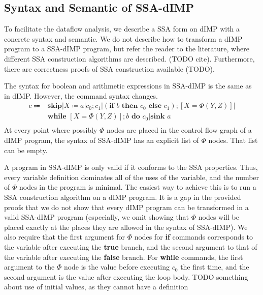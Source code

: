 \subsection{Syntax and Semantic of SSA-dIMP}
To facilitate the dataflow analysis, we describe a SSA form on dIMP with a concrete
syntax and semantic.
We do not describe how to transform a dIMP program to a SSA-dIMP program, but 
refer the reader to the literature, where different SSA construction algorithms are
described. (TODO cite). Furthermore, there are correctness proofs of SSA construction
available (TODO).

The syntax for boolean and arithmetic expressions in SSA-dIMP is the same as in dIMP.
However, the command syntax changes.
\begin{align*}
    c \Coloneqq &\textbf{skip} | X \coloneqq a| c_0; c_1 | (\textbf{if } b \textbf{ then }c_0
    \textbf{ else }c_1);[X = \Phi(Y, Z)] |\\
    &\textbf{while }[X = \Phi(Y, Z)]; b\textbf{ do } c_0 | \textbf{sink } a\\
\end{align*}
At every point where possibly $\Phi$ nodes are placed in the control flow graph
of a dIMP program, the syntax of SSA-dIMP has an explicit list of $\Phi$ nodes.
That list can be empty.

A program in SSA-dIMP is only valid if it conforms to the SSA properties.
Thus, every variable definition dominates all of the uses of the variable, and
the number of $\Phi$ nodes in the program is minimal.
The easiest way to achieve this is to run a SSA construction algorithm on a dIMP program.
It is a gap in the provided proofs that we do not show that every dIMP program
can be transformed in a valid SSA-dIMP program (especially, we omit showing that
$\Phi$ nodes will be placed exactly at the places they are allowed in the syntax
of SSA-dIMP).
We also require that the first argument for $\Phi$ nodes for \textbf{if} commands
corresponds to the variable after executing the \textbf{true} branch, and the second argument to that
of the variable after executing the \textbf{false} branch.
For \textbf{while} commands, the first argument to the $\Phi$ node is the value
before executing $c_0$ the first time, and the second argument is the value 
after executing the loop body.
TODO something about use of initial values, as they cannot have a definition

